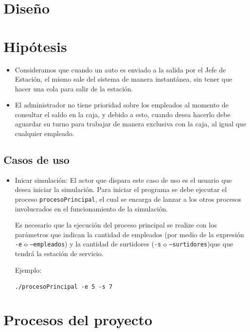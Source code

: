 \documentclass[12pt,a4paper,spanish]{article}
\begin{document}

\newpage
\tableofcontents
\newpage
\section{Diseño}

\section{Hipótesis}

\begin{itemize}
	\item Consideramos que cuando un auto es enviado a la salida por el Jefe de Estación,
	el mismo sale del sistema de manera instantánea, sin tener que hacer una cola
	para salir de la estación.

	\item El administrador no tiene prioridad sobre los empleados al momento de consultar
	el saldo en la caja, y debido a esto, cuando desea hacerlo debe aguardar su turno para
	trabajar de manera exclusiva con la caja, al igual que cualquier empleado.
\end{itemize}

\subsection{Casos de uso}

\begin{itemize}
	\item Inicar simulación: El actor que dispara este caso de uso es el usuario
	que desea iniciar la simulación. Para iniciar el programa se debe ejecutar el
	proceso \texttt{procesoPrincipal}, el cual se encarga de
	lanzar a los otros procesos involucrados en el funcionamiento de la simulación.

	Es necesario que la ejecución del proceso principal se realize con los parámetros
	que indican la cantidad de empleados (por medio de la expresión \texttt{-e} o \texttt{--empleados})
	y la cantidad de surtidores (\texttt{-s} o \texttt{--surtidores})que que tendrá la
	estación de servicio.

	Ejemplo:

	\texttt{./procesoPrincipal -e 5 -s 7}
\end{itemize}

\section{Procesos del proyecto}
\end{document}
